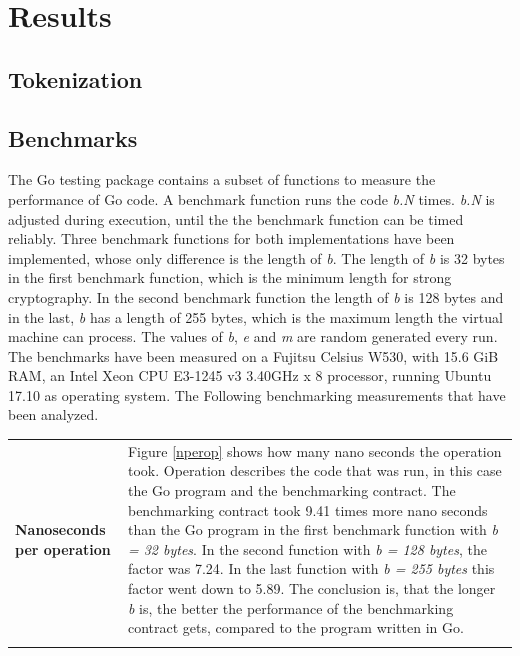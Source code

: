\section{Results}
\subsection{Tokenization}

\subsection{Benchmarks}
The Go testing package contains a subset of functions to measure the performance of Go code. A benchmark function runs the code \textit{b.N} times. \textit{b.N} is adjusted during execution, until the the benchmark function can be timed reliably. \cite{golang_testing} Three benchmark functions for both implementations have been implemented, whose only difference is the length of \textit{b}. The length of \textit{b} is 32 bytes in the first benchmark function, which is the minimum length for strong cryptography. In the second benchmark function the length of \textit{b} is 128 bytes and in the last, \textit{b} has a length of 255 bytes, which is the maximum length the virtual machine can process. The values of \textit{b}, \textit{e} and \textit{m} are random generated every run. The benchmarks have been measured on a Fujitsu Celsius W530, with 15.6 GiB RAM, an Intel Xeon CPU E3-1245 v3 \@ 3.40GHz x 8 processor, running Ubuntu 17.10 as operating system. The Following benchmarking measurements that have been analyzed. 

\begin{tabular}[t]{ p{3cm} p{12.5cm}}
\raggedright
\textbf{Nanoseconds per operation} &
Figure \ref{nperop} shows how many nano seconds the operation took. Operation describes the code that was run, in this case the Go program and the benchmarking contract. The benchmarking contract took 9.41 times more nano seconds than the Go program in the first benchmark function with \textit{b = 32 bytes}. In the second function with \textit{b = 128 bytes}, the factor was 7.24. In the last function with \textit{b = 255 bytes} this factor went down to 5.89. The conclusion is, that the longer \textit{b} is, the better the performance of the benchmarking contract gets, compared to the program written in Go. \\ \\
\end{tabular}

